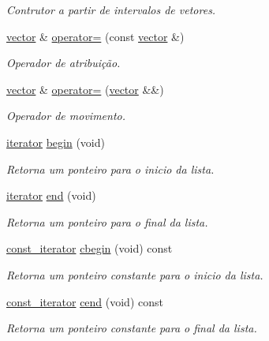 \begin{DoxyCompactItemize}
\begin{DoxyCompactList}\small\item\em Contrutor a partir de intervalos de vetores. \end{DoxyCompactList}\item 
\hyperlink{classsc_1_1vector}{vector} \& \hyperlink{classsc_1_1vector_aa39c1f22582a429142479349a40cbbb7}{operator=} (const \hyperlink{classsc_1_1vector}{vector} \&)
\begin{DoxyCompactList}\small\item\em Operador de atribuição. \end{DoxyCompactList}\item 
\hyperlink{classsc_1_1vector}{vector} \& \hyperlink{classsc_1_1vector_a8d6fa43cf97edad41fe82e4c91b3d064}{operator=} (\hyperlink{classsc_1_1vector}{vector} \&\&)
\begin{DoxyCompactList}\small\item\em Operador de movimento. \end{DoxyCompactList}\item 
\hyperlink{classsc_1_1vector_a9e5d5cc35e379aa27a93989f4a71413c}{iterator} \hyperlink{classsc_1_1vector_ae198130cd01e8d5a4df07d6567b51eb4}{begin} (void)
\begin{DoxyCompactList}\small\item\em Retorna um ponteiro para o inicio da lista. \end{DoxyCompactList}\item 
\hyperlink{classsc_1_1vector_a9e5d5cc35e379aa27a93989f4a71413c}{iterator} \hyperlink{classsc_1_1vector_a15b7f4313d7a011694d154c030768ad3}{end} (void)
\begin{DoxyCompactList}\small\item\em Retorna um ponteiro para o final da lista. \end{DoxyCompactList}\item 
\hyperlink{classsc_1_1vector_a1e50aa429ea9de6ead4bfdb8614c1c9a}{const\+\_\+iterator} \hyperlink{classsc_1_1vector_abf97464250caf4653a104fff421943c8}{cbegin} (void) const
\begin{DoxyCompactList}\small\item\em Retorna um ponteiro constante para o inicio da lista. \end{DoxyCompactList}\item 
\hyperlink{classsc_1_1vector_a1e50aa429ea9de6ead4bfdb8614c1c9a}{const\+\_\+iterator} \hyperlink{classsc_1_1vector_aa6a2e50e9f3eec904cf6ec0f357c8180}{cend} (void) const
\begin{DoxyCompactList}\small\item\em Retorna um ponteiro constante para o final da lista. \end{DoxyCompactList}\item 

\end{DoxyCompactItemize}
